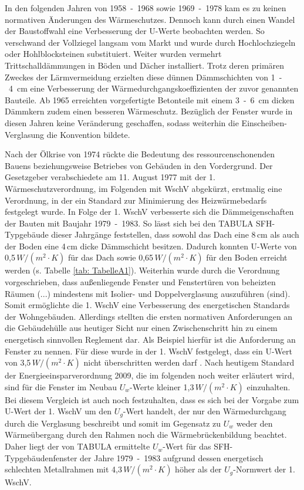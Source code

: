 In den folgenden Jahren von \mbox{1958 - 1968} sowie \mbox{1969 - 1978} kam es zu keinen normativen Änderungen des Wärmeschutzes. 
Dennoch kann durch einen Wandel der Baustoffwahl eine Verbesserung der U-Werte beobachten werden. 
So verschwand der Vollziegel langsam vom Markt und wurde durch Hochlochziegeln oder Hohlblocksteinen substituiert.
Weiter wurden vermehrt Trittschalldämmungen in Böden und Dächer installiert. 
Trotz deren primären Zweckes der Lärmvermeidung erzielten diese dünnen Dämmschichten von \mbox{1 - 4 cm} eine Verbesserung der Wärmedurchgangskoeffizienten der zuvor genannten Bauteile.
Ab 1965 erreichten vorgefertigte Betonteile mit einem \mbox{3 - 6 cm} dicken Dämmkern zudem einen besseren Wärmeschutz.
Bezüglich der Fenster wurde in diesen Jahren keine Veränderung geschaffen, sodass weiterhin die Einscheiben-Verglasung die Konvention bildete. \cite{EickeHenning.2011}

Nach der Ölkrise von 1974 rückte die Bedeutung des ressourcenschonenden Bauens beziehungsweise Betriebes von Gebäuden in den Vordergrund. 
Der Gesetzgeber verabschiedete am 11. August 1977 mit der 1. Wärmeschutzverordnung, im Folgenden mit WschV abgekürzt, erstmalig eine Verordnung, in der ein Standard zur Minimierung des Heizwärmebedarfs festgelegt wurde. 
In Folge der 1. WschV verbesserte sich die Dämmeigenschaften der Bauten mit Baujahr \mbox{1979 - 1983}.
So lässt sich bei den TABULA SFH-Typgebäude dieser Jahrgänge feststellen, dass sowohl das Dach eine 8\,cm als auch der Boden eine 4\,cm dicke Dämmschicht besitzen. 
Dadurch konnten U-Werte von 0,5\,\(W/(m^2 \cdot K) \) für das Dach sowie 0,65\,\(W/(m^2 \cdot K) \) für den Boden erreicht werden (s. Tabelle \ref{tab: TabelleA1}).
Weiterhin wurde durch die Verordnung vorgeschrieben, dass \glqq außenliegende Fenster und Fenstertüren von beheizten Räumen (...) mindestens mit Isolier- und Doppelverglasung auszuführen (sind)\grqq \cite{Bundesregierung.1977}.
Somit ermöglichte die 1. WschV eine Verbesserung des energetischen Standards der Wohngebäuden. 
Allerdings stellten die ersten normativen Anforderungen an die Gebäudehülle aus heutiger Sicht nur einen Zwischenschritt hin zu einem energetisch sinnvollen Reglement dar.
Als Beispiel hierfür ist die Anforderung an Fenster zu nennen. 
Für diese wurde in der 1. WschV festgelegt, dass ein U-Wert von 3,5\,\(W/(m^2 \cdot K) \) nicht überschritten werden darf \cite{Bundesregierung.1977}.
Nach heutigem Standard der Energieeinsparverordnung 2009, die im folgenden noch weiter erläutert wird, sind für die Fenster im Neubau \(U_w\)-Werte kleiner 1,3\,\(W/(m^2 \cdot K) \) einzuhalten.
Bei diesem Vergleich ist auch noch festzuhalten, dass es sich bei der Vorgabe zum U-Wert der 1. WschV um den \(U_g\)-Wert handelt, der nur den Wärmedurchgang durch die Verglasung beschreibt und somit im Gegensatz zu \(U_w\) weder den Wärmeübergang durch den Rahmen noch die Wärmebrückenbildung beachtet. 
Daher liegt der von TABULA ermittelte \(U_w\)-Wert für das SFH-Typgebäudenfenster der Jahre \mbox{1979 - 1983} aufgrund dessen energetisch schlechten Metallrahmen mit 4,3\,\(W/(m^2 \cdot K) \) höher als der \(U_g\)-Normwert der 1. WschV. \cite{EickeHenning.2011} 

